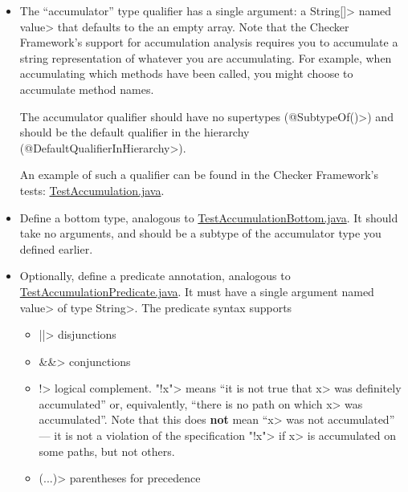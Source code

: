 \begin{itemize}
\item
The ``accumulator'' type qualifier has a single argument: a \<String[]> named
\<value> that defaults to the an empty array.  Note that the Checker Framework's
support for accumulation analysis requires you to accumulate a string representation
of whatever you are accumulating. For example, when accumulating which methods have
been called, you might choose to accumulate method names.

The accumulator
qualifier should have no supertypes (\<@SubtypeOf({})>) and should
be the default qualifier in the hierarchy (\<@DefaultQualifierInHierarchy>).

An example of such a qualifier can be found in the Checker Framework's tests:
\href{https://github.com/typetools/checker-framework/blob/master/framework/src/test/java/org/checkerframework/framework/testchecker/testaccumulation/qual/TestAccumulation.java}{TestAccumulation.java}.

\item
Define a bottom type, analogous to
\href{https://github.com/typetools/checker-framework/blob/master/framework/src/test/java/org/checkerframework/framework/testchecker/testaccumulation/qual/TestAccumulationBottom.java}{TestAccumulationBottom.java}.
It should take no arguments, and should be a subtype of the accumulator type you defined earlier.

\item
Optionally, define a predicate annotation, analogous to
\href{https://github.com/typetools/checker-framework/blob/master/framework/src/test/java/org/checkerframework/framework/testchecker/testaccumulation/qual/TestAccumulationPredicate.java}{TestAccumulationPredicate.java}.
It must have a single argument named \<value> of type \<String>.
The predicate syntax supports
\begin{itemize}
\item \<||> disjunctions
\item \<\&\&> conjunctions
\item \<!> logical complement.  \<"!x"> means
``it is not true that \<x> was definitely accumulated'' or, equivalently, ``there is no path on which \<x> was accumulated''.
Note that this does \textbf{not} mean ``\<x> was not accumulated'' --- it is not a violation of the specification \<"!x"> if \<x> is accumulated
on some paths, but not others.
\item \<(...)> parentheses for precedence
\end{itemize}

\end{itemize}

